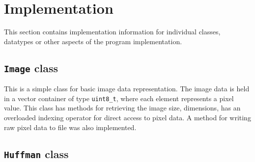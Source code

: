 \documentclass[pdftex, 11pt, a4paper, titlepage]{article}
\newcommand{\code}{\texttt}
\begin{document}
    \section{Implementation}
    This section contains implementation information for individual classes, datatypes or other aspects
    of the program implementation.

    \subsection{\code{Image} class} \label{sec:Image_class}
    This is a simple class for basic image data representation. The image data is held in a vector
    container of type \code{uint8\_t}, where each element represents a pixel value. This class has
    methods for retrieving the image size, dimensions, has an overloaded indexing operator for direct
    access to pixel data. A method for writing raw pixel data to file was also implemented.

    \subsection{\code{Huffman} class} \label{sec:Huffman_class}
\end{document}
